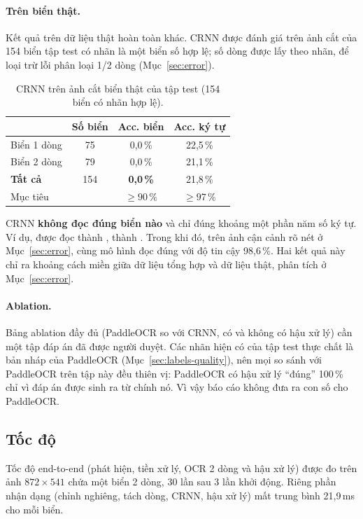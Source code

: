 \paragraph{Trên biển thật.} Kết quả trên dữ liệu thật hoàn toàn khác. CRNN được đánh giá trên ảnh cắt của 154 biển tập test có nhãn là một biển số hợp lệ; số dòng được lấy theo nhãn, để loại trừ lỗi phân loại 1/2 dòng (Mục~\ref{sec:error}).

\begin{table}[H]
\centering
\caption{CRNN trên ảnh cắt biển thật của tập test (154 biển có nhãn hợp lệ).}
\label{tab:real}
\begin{tabular}{lccc}
\toprule
 & Số biển & Acc. biển & Acc. ký tự \\
\midrule
Biển 1 dòng & 75 & 0,0\,\% & 22,5\,\% \\
Biển 2 dòng & 79 & 0,0\,\% & 21,1\,\% \\
\midrule
\textbf{Tất cả} & 154 & \textbf{0,0\,\%} & 21,8\,\% \\
\midrule
Mục tiêu & & $\geq 90\,\%$ & $\geq 97\,\%$ \\
\bottomrule
\end{tabular}
\end{table}

CRNN \textbf{không đọc đúng biển nào} và chỉ đúng khoảng một phần năm số ký tự. Ví dụ,  được đọc thành ,  thành . Trong khi đó, trên ảnh cận cảnh rõ nét ở Mục~\ref{sec:error}, cùng mô hình đọc đúng với độ tin cậy 98,6\,\%. Hai kết quả này chỉ ra khoảng cách miền giữa dữ liệu tổng hợp và dữ liệu thật, phân tích ở Mục~\ref{sec:error}.

\paragraph{Ablation.} Bảng ablation đầy đủ (PaddleOCR so với CRNN, có và không có hậu xử lý) cần một tập đáp án đã được người duyệt. Các nhãn hiện có của tập test thực chất là bản nháp của PaddleOCR (Mục~\ref{sec:labels-quality}), nên mọi so sánh với PaddleOCR trên tập này đều thiên vị: PaddleOCR có hậu xử lý ``đúng'' 100\,\% chỉ vì đáp án được sinh ra từ chính nó. Vì vậy báo cáo không đưa ra con số cho PaddleOCR.

\subsection{Tốc độ}
Tốc độ end-to-end (phát hiện, tiền xử lý, OCR 2 dòng và hậu xử lý) được đo trên ảnh $872 \times 541$ chứa một biển 2 dòng, 30 lần sau 3 lần khởi động. Riêng phần nhận dạng (chỉnh nghiêng, tách dòng, CRNN, hậu xử lý) mất trung bình 21,9\,ms cho mỗi biển.

